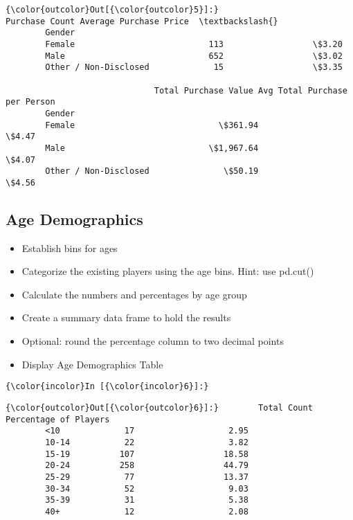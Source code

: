 \documentclass[11pt]{article}
\begin{document}
\begin{Verbatim}[commandchars=\\\{\}]
{\color{outcolor}Out[{\color{outcolor}5}]:}                       Purchase Count Average Purchase Price  \textbackslash{}
        Gender                                                        
        Female                           113                  \$3.20   
        Male                             652                  \$3.02   
        Other / Non-Disclosed             15                  \$3.35   
        
                              Total Purchase Value Avg Total Purchase per Person  
        Gender                                                                    
        Female                             \$361.94                         \$4.47  
        Male                             \$1,967.64                         \$4.07  
        Other / Non-Disclosed               \$50.19                         \$4.56  
\end{Verbatim}
            
    \hypertarget{age-demographics}{%
\subsection{Age Demographics}\label{age-demographics}}

    \begin{itemize}
\item
  Establish bins for ages
\item
  Categorize the existing players using the age bins. Hint: use pd.cut()
\item
  Calculate the numbers and percentages by age group
\item
  Create a summary data frame to hold the results
\item
  Optional: round the percentage column to two decimal points
\item
  Display Age Demographics Table
\end{itemize}

    \begin{Verbatim}[commandchars=\\\{\}]
{\color{incolor}In [{\color{incolor}6}]:} 
\end{Verbatim}


\begin{Verbatim}[commandchars=\\\{\}]
{\color{outcolor}Out[{\color{outcolor}6}]:}        Total Count  Percentage of Players
        <10             17                   2.95
        10-14           22                   3.82
        15-19          107                  18.58
        20-24          258                  44.79
        25-29           77                  13.37
        30-34           52                   9.03
        35-39           31                   5.38
        40+             12                   2.08
\end{Verbatim}
            
\end{document}
